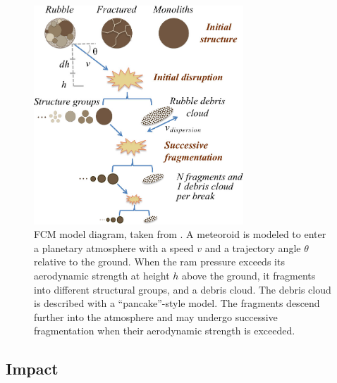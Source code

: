 \begin{figure}
    \centering
    \includegraphics[width=0.7\textwidth]{figures/wheeler_diagram.jpg}
    \caption{FCM model diagram, taken from \cite{wheeler2018atmospheric}.
        A meteoroid is modeled to enter a planetary atmosphere with a speed $v$ and a trajectory angle $\theta$ relative to the ground. When the ram pressure exceeds its aerodynamic strength at height $h$ above the ground, it fragments into different structural groups, and a debris cloud. The debris cloud is described with a ``pancake''-style model. The fragments descend further into the atmosphere and may undergo successive fragmentation when their aerodynamic strength is exceeded.\label{fig:FCMv2}}
\end{figure}

\subsection{Impact}

